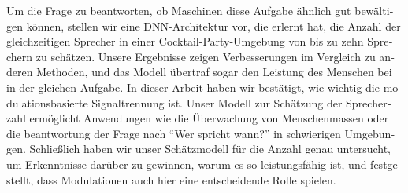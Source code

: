 \begin{otherlanguage}{ngerman}
Um die Frage zu beantworten, ob Maschinen diese Aufgabe ähnlich gut bewältigen können, stellen wir eine DNN-Architektur vor, die erlernt hat, die Anzahl der gleichzeitigen Sprecher in einer Cocktail-Party-Umgebung von bis zu zehn Sprechern zu schätzen.
Unsere Ergebnisse zeigen Verbesserungen im Vergleich zu anderen Methoden, und das Modell übertraf sogar den Leistung des Menschen bei in der gleichen Aufgabe.
In dieser Arbeit haben wir bestätigt, wie wichtig die modulationsbasierte Signaltrennung ist. 
Unser Modell zur Schätzung der Sprecherzahl ermöglicht Anwendungen wie die Überwachung von Menschenmassen oder die beantwortung der Frage nach ``Wer spricht wann?'' in schwierigen Umgebungen.
Schließlich haben wir unser Schätzmodell für die Anzahl genau untersucht, um Erkenntnisse darüber zu gewinnen, warum es so leistungsfähig ist, und festgestellt, dass Modulationen auch hier eine entscheidende Rolle spielen.
\end{otherlanguage}

\endgroup

\vfill
